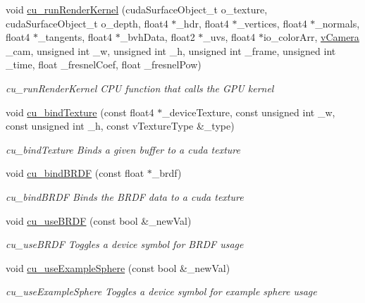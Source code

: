 \begin{DoxyCompactItemize}
\item 
void \hyperlink{PathTracer_8cuh_ac928700f7e1284e9c48b3e9972057216}{cu\-\_\-run\-Render\-Kernel} (cuda\-Surface\-Object\-\_\-t o\-\_\-texture, cuda\-Surface\-Object\-\_\-t o\-\_\-depth, float4 $\ast$\-\_\-hdr, float4 $\ast$\-\_\-vertices, float4 $\ast$\-\_\-normals, float4 $\ast$\-\_\-tangents, float4 $\ast$\-\_\-bvh\-Data, float2 $\ast$\-\_\-uvs, float4 $\ast$io\-\_\-color\-Arr, \hyperlink{structvCamera}{v\-Camera} \-\_\-cam, unsigned int \-\_\-w, unsigned int \-\_\-h, unsigned int \-\_\-frame, unsigned int \-\_\-time, float \-\_\-fresnel\-Coef, float \-\_\-fresnel\-Pow)
\begin{DoxyCompactList}\small\item\em cu\-\_\-run\-Render\-Kernel C\-P\-U function that calls the G\-P\-U kernel \end{DoxyCompactList}\item 
void \hyperlink{PathTracer_8cuh_a3c5a077c055656ec04072e241cb8abd9}{cu\-\_\-bind\-Texture} (const float4 $\ast$\-\_\-device\-Texture, const unsigned int \-\_\-w, const unsigned int \-\_\-h, const v\-Texture\-Type \&\-\_\-type)
\begin{DoxyCompactList}\small\item\em cu\-\_\-bind\-Texture Binds a given buffer to a cuda texture \end{DoxyCompactList}\item 
void \hyperlink{PathTracer_8cuh_a96b4e745cacc70a0e1007d7df5176864}{cu\-\_\-bind\-B\-R\-D\-F} (const float $\ast$\-\_\-brdf)
\begin{DoxyCompactList}\small\item\em cu\-\_\-bind\-B\-R\-D\-F Binds the B\-R\-D\-F data to a cuda texture \end{DoxyCompactList}\item 
void \hyperlink{PathTracer_8cuh_adf3705d0e2ca2e89001457104fefd218}{cu\-\_\-use\-B\-R\-D\-F} (const bool \&\-\_\-new\-Val)
\begin{DoxyCompactList}\small\item\em cu\-\_\-use\-B\-R\-D\-F Toggles a device symbol for B\-R\-D\-F usage \end{DoxyCompactList}\item 
void \hyperlink{PathTracer_8cuh_a0ebc9aa3ce310c2cd3c99793c212aefa}{cu\-\_\-use\-Example\-Sphere} (const bool \&\-\_\-new\-Val)
\begin{DoxyCompactList}\small\item\em cu\-\_\-use\-Example\-Sphere Toggles a device symbol for example sphere usage \end{DoxyCompactList}\item 

\end{DoxyCompactItemize}
